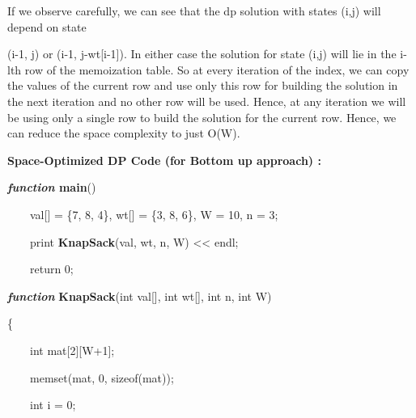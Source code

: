 \documentclass[letterpaper]{article}
\begin{document}
\begin{multicols}{2}
\begin{itemize}
If we observe carefully, we can see that the dp solution with states (i,j) will depend on state 

(i-1, j) or (i-1, j-wt[i-1]). In either case the solution for state (i,j) will lie in the i-lth row of the memoization
table. So at every iteration of the index, we can copy the values of the current row and use only this row for building
the solution in the next iteration and no other row will be used. Hence, at any iteration we will be using only a
single row to build the solution for the current row. Hence, we can reduce the space complexity to just O(W).


\bigskip


\bigskip


\bigskip

\textbf{Space-Optimized DP Code (for Bottom up approach) :} 


\bigskip


\bigskip

\textbf{\textit{\textcolor[rgb]{0.2509804,0.25882354,0.30588236}{function}}}\textbf{\textcolor[rgb]{0.2509804,0.25882354,0.30588236}{
main}}\textcolor[rgb]{0.2509804,0.25882354,0.30588236}{()}

{\color[rgb]{0.2509804,0.25882354,0.30588236}
\ \ \ \ val[] = \{7, 8, 4\}, wt[] = \{3, 8, 6\}, W = 10, n = 3;}

\textcolor[rgb]{0.2509804,0.25882354,0.30588236}{\ \ \ \ print
}\textbf{\textcolor[rgb]{0.2509804,0.25882354,0.30588236}{KnapSack}}\textcolor[rgb]{0.2509804,0.25882354,0.30588236}{(val,
wt, n, W) {\textless}{\textless} endl;}

{\color[rgb]{0.2509804,0.25882354,0.30588236}
\ \ \ \ return 0;}


\bigskip

\textbf{\textit{\textcolor[rgb]{0.2509804,0.25882354,0.30588236}{function}}}\textcolor[rgb]{0.2509804,0.25882354,0.30588236}{
}\textbf{\textcolor[rgb]{0.2509804,0.25882354,0.30588236}{KnapSack}}\textcolor[rgb]{0.2509804,0.25882354,0.30588236}{(int
val[], int wt[], int n, int W)}

{\color[rgb]{0.2509804,0.25882354,0.30588236}
\{}

{\color[rgb]{0.2509804,0.25882354,0.30588236}
\ \ \ \ int mat[2][W+1];}

{\color[rgb]{0.2509804,0.25882354,0.30588236}
\ \ \ \ memset(mat, 0, sizeof(mat));}


\bigskip

{\color[rgb]{0.2509804,0.25882354,0.30588236}
\ \ \ \ int i = 0;}


\end{itemize}
\end{multicols}
\end{document}
